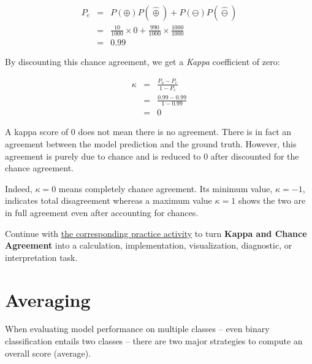 \documentclass[
  letterpaper,
]{scrbook}
\begin{document}
\[\begin{aligned}
  P_e
  & = & P(\oplus) P(\hat{\oplus}) + P(\ominus) P(\hat{\ominus}) \\
  & = & \frac{10}{1000} \times 0 + \frac{990}{1000} \times \frac{1000}{1000} \\
  & = & 0.99
\end{aligned}\]

By discounting this chance agreement, we get a \emph{Kappa} coefficient
of zero:

\[\begin{aligned}
  \kappa
  & = & \frac{P_o - P_e}{1 - P_e} \\
  & = & \frac{0.99 - 0.99}{1 - 0.99} \\
  & = & 0
\end{aligned}\]

A kappa score of \(0\) does not mean there is no agreement. There is in
fact an agreement between the model prediction and the ground truth.
However, this agreement is purely due to chance and is reduced to \(0\)
after discounted for the chance agreement.

Indeed, \(\kappa=0\) means completely chance agreement. Its minimum
value, \(\kappa=-1\), indicates total disagreement whereas a maximum
value \(\kappa=1\) shows the two are in full agreement even after
accounting for chances.

\begin{tcolorbox}[enhanced jigsaw, arc=.35mm, bottomrule=.15mm, bottomtitle=1mm, breakable, colback=white, colbacktitle=quarto-callout-tip-color!10!white, colframe=quarto-callout-tip-color-frame, coltitle=black, left=2mm, leftrule=.75mm, opacityback=0, opacitybacktitle=0.6, rightrule=.15mm, title=\textcolor{quarto-callout-tip-color}{\faLightbulb}\hspace{0.5em}{Put it into practice}, titlerule=0mm, toprule=.15mm, toptitle=1mm]

Continue with \hyperref[sec-pr-14-kappa-and-chance-agreement]{the
corresponding practice activity} to turn \textbf{Kappa and Chance
Agreement} into a calculation, implementation, visualization,
diagnostic, or interpretation task.

\end{tcolorbox}

\section{Averaging}\label{averaging}

When evaluating model performance on multiple classes -- even binary
classification entails two classes -- there are two major strategies to
compute an overall score (average).
\end{document}

